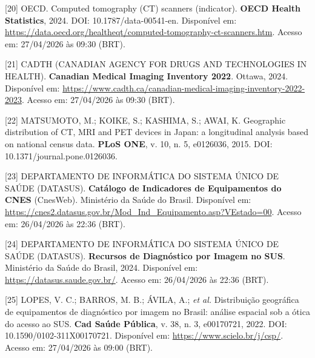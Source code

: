 \documentclass[12pt,a4paper,oneside]{article}
\begin{document}
\begin{singlespace}
\noindent\hangindent=1.25cm\label{ref:oecd-ct}
[20] OECD. Computed tomography (CT) scanners (indicator). \textbf{OECD
Health Statistics}, 2024. DOI: 10.1787/data-00541-en. Disponível em:
\url{https://data.oecd.org/healtheqt/computed-tomography-ct-scanners.htm}.
Acesso em: 27/04/2026 às 09:30 (BRT).\par\smallskip

\noindent\hangindent=1.25cm\label{ref:cmii}
[21] CADTH (CANADIAN AGENCY FOR DRUGS AND TECHNOLOGIES IN HEALTH).
\textbf{Canadian Medical Imaging Inventory 2022}.
Ottawa, 2024. Disponível em:
\url{https://www.cadth.ca/canadian-medical-imaging-inventory-2022-2023}.
Acesso em: 27/04/2026 às 09:30 (BRT).\par\smallskip

\noindent\hangindent=1.25cm\label{ref:japan-imaging}
[22] MATSUMOTO, M.; KOIKE, S.; KASHIMA, S.; AWAI, K. Geographic
distribution of CT, MRI and PET devices in Japan: a longitudinal
analysis based on national census data. \textbf{PLoS ONE}, v. 10,
n. 5, e0126036, 2015. DOI: 10.1371/journal.pone.0126036.\par\smallskip

\noindent\hangindent=1.25cm\label{ref:datasus-cat}
[23] DEPARTAMENTO DE INFORMÁTICA DO SISTEMA ÚNICO DE SAÚDE (DATASUS).
\textbf{Catálogo de Indicadores de Equipamentos do CNES} (CnesWeb).
Ministério da Saúde do Brasil. Disponível em:
\url{https://cnes2.datasus.gov.br/Mod_Ind_Equipamento.asp?VEstado=00}.
Acesso em: 26/04/2026 às 22:36 (BRT).\par\smallskip

\noindent\hangindent=1.25cm\label{ref:datasus}
[24] DEPARTAMENTO DE INFORMÁTICA DO SISTEMA ÚNICO DE SAÚDE (DATASUS).
\textbf{Recursos de Diagnóstico por Imagem no SUS}. Ministério da
Saúde do Brasil, 2024. Disponível em:
\url{https://datasus.saude.gov.br/}. Acesso em: 26/04/2026 às 22:36 (BRT).\par\smallskip

\noindent\hangindent=1.25cm\label{ref:lopes}
[25] LOPES, V. C.; BARROS, M. B.; ÁVILA, A.; \textit{et al.}
Distribuição geográfica de equipamentos de diagnóstico por imagem
no Brasil: análise espacial sob a ótica do acesso ao SUS.
\textbf{Cad Saúde Pública}, v. 38, n. 3, e00170721, 2022. DOI:
10.1590/0102-311X00170721. Disponível em:
\url{https://www.scielo.br/j/csp/}. Acesso em: 27/04/2026 às 09:00 (BRT).
\par\smallskip


\end{singlespace}
\end{document}
